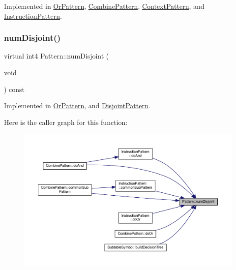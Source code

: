 Implemented in \mbox{\hyperlink{class_or_pattern_adb47d2014fe8dea89cd155122442c2c2}{Or\+Pattern}}, \mbox{\hyperlink{class_combine_pattern_a89e54d4844001bc9a4916bb643e00fba}{Combine\+Pattern}}, \mbox{\hyperlink{class_context_pattern_ae9007dafab8003fbde577e75813000d1}{Context\+Pattern}}, and \mbox{\hyperlink{class_instruction_pattern_a879ab052ff7d4082fde3bd53a457a21b}{Instruction\+Pattern}}.

\mbox{\label{class_pattern_acc63885639671e7813c6308d3c425ab2}} 
\subsubsection{\texorpdfstring{numDisjoint()}{numDisjoint()}}
{\footnotesize\ttfamily virtual int4 Pattern\+::num\+Disjoint (\begin{DoxyParamCaption}\item[{void}]{ }\end{DoxyParamCaption}) const\hspace{0.3cm}{\ttfamily [pure virtual]}}



Implemented in \mbox{\hyperlink{class_or_pattern_a7cf494190ca4e0258ac7c52157347f8c}{Or\+Pattern}}, and \mbox{\hyperlink{class_disjoint_pattern_a33027f50347c5d747a8a473974db466f}{Disjoint\+Pattern}}.

Here is the caller graph for this function\+:
\nopagebreak
\begin{figure}[H]
\begin{center}
\leavevmode
\includegraphics[width=350pt]{class_pattern_acc63885639671e7813c6308d3c425ab2_icgraph}
\end{center}
\end{figure}
\mbox{\label{class_pattern_aaa8fb2873854fb42d944fa8876102bb5}} 
